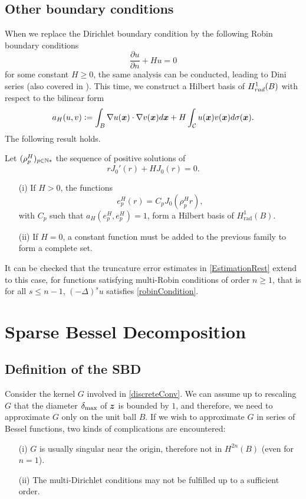 \documentclass{article}
\begin{document}
\subsection{Other boundary conditions}
\label{Robin}
When we replace the Dirichlet boundary condition by the following Robin boundary conditions
\begin{equation}
	\label{robinCondition}
	\dfrac{\partial u}{\partial n} + H u = 0
\end{equation}
for some constant $H \geq 0$, the same analysis can be conducted, leading to Dini series (also covered in \cite{watson1995treatise}). This time, we construct a Hilbert basis of $H^1_{rad}(B)$ with respect to the bilinear form
\[a_H(u,v) \mathrel{\mathop:}= \int_{B} \nabla u(\boldsymbol{x} ) \cdot \nabla v(\boldsymbol{x} ) d\boldsymbol{x} + H \int_{\mathcal{C}}{u(\boldsymbol{x} )v(\boldsymbol{x} )}d\sigma(\boldsymbol{x} ).\]
The following result holds. 
\begin{Theorem}
	Let $(\rho_p^H)_{p \in \mathbb{N}*}$ the sequence of positive solutions of
	\[r J_0'(r) + H J_0(r) = 0.\]
	\begin{itemize}
		\item[(i)] If $H>0$, the functions 
		\[e_p^H(r) = C_p J_0(\rho_p^H r),\]
		with $C_p$ such that $a_H(e_p^H,e_p^H) = 1$, form a Hilbert basis of $H^1_{\text{rad}}(B)$. 
		\item[(ii)]If $H = 0$, a constant function must be added to the previous family to form a complete set. 
	\end{itemize}
\end{Theorem}
\noindent It can be checked that the truncature error estimates in \autoref{EstimationRest} extend to this case, for functions satisfying multi-Robin conditions of order $n \geq 1$, that is for all $s\leq n-1$, $(-\Delta)^s u$ satisfies \eqref{robinCondition}.
							
			
										
\section{Sparse Bessel Decomposition}

\label{sec:SBD}
\subsection{Definition of the SBD}
										
Consider the kernel $G$ involved in \eqref{discreteConv}. We can assume up to rescaling $G$ that the diameter $\delta_{\max}$ of $\boldsymbol{z}$ is bounded by $1$, and therefore, we need to approximate $G$ only on the unit ball $B$. 
If we wish to approximate $G$ in series of Bessel functions, two kinds of complications are encountered:
\begin{itemize}
	\item[(i)] $G$ is usually singular near the origin, therefore not in $H^{2n}(B)$ (even for $n=1$). 
	\item[(ii)] The multi-Dirichlet conditions may not be fulfilled up to a sufficient order.
\end{itemize}
\end{document}
